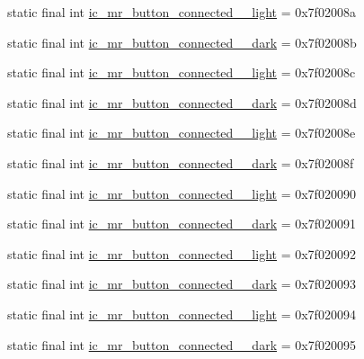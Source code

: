 \begin{CompactItemize}
\item 
static final int \hyperlink{classandroid_1_1support_1_1v7_1_1palette_1_1_r_1_1drawable_654a4f097dbb07716d0e2e15bcf35015}{ic\_\-mr\_\-button\_\-connected\_\_\-light} = 0x7f02008a
\item 
static final int \hyperlink{classandroid_1_1support_1_1v7_1_1palette_1_1_r_1_1drawable_660e1b0b5075051eba6f149d23b929e4}{ic\_\-mr\_\-button\_\-connected\_\_\-dark} = 0x7f02008b
\item 
static final int \hyperlink{classandroid_1_1support_1_1v7_1_1palette_1_1_r_1_1drawable_13553e0e8a4ba0c8f5db3b864c98f6d0}{ic\_\-mr\_\-button\_\-connected\_\_\-light} = 0x7f02008c
\item 
static final int \hyperlink{classandroid_1_1support_1_1v7_1_1palette_1_1_r_1_1drawable_2c73829dd1804f9e5162dd7b39815b56}{ic\_\-mr\_\-button\_\-connected\_\_\-dark} = 0x7f02008d
\item 
static final int \hyperlink{classandroid_1_1support_1_1v7_1_1palette_1_1_r_1_1drawable_2d203487b7f3edd479811921deea5f8e}{ic\_\-mr\_\-button\_\-connected\_\_\-light} = 0x7f02008e
\item 
static final int \hyperlink{classandroid_1_1support_1_1v7_1_1palette_1_1_r_1_1drawable_006099a5a9c6380cf6bb966d02b897a0}{ic\_\-mr\_\-button\_\-connected\_\_\-dark} = 0x7f02008f
\item 
static final int \hyperlink{classandroid_1_1support_1_1v7_1_1palette_1_1_r_1_1drawable_65f572d8d3689dd71ca137446f8d0982}{ic\_\-mr\_\-button\_\-connected\_\_\-light} = 0x7f020090
\item 
static final int \hyperlink{classandroid_1_1support_1_1v7_1_1palette_1_1_r_1_1drawable_e6784a5baf90ed8d2f946b2544700c47}{ic\_\-mr\_\-button\_\-connected\_\_\-dark} = 0x7f020091
\item 
static final int \hyperlink{classandroid_1_1support_1_1v7_1_1palette_1_1_r_1_1drawable_d81349bbc50c8910d729653e4545743b}{ic\_\-mr\_\-button\_\-connected\_\_\-light} = 0x7f020092
\item 
static final int \hyperlink{classandroid_1_1support_1_1v7_1_1palette_1_1_r_1_1drawable_68be17a073f9f7c34fe94fe2e07567d0}{ic\_\-mr\_\-button\_\-connected\_\_\-dark} = 0x7f020093
\item 
static final int \hyperlink{classandroid_1_1support_1_1v7_1_1palette_1_1_r_1_1drawable_fee44c7eb17a1b6755db4d4ed33d1999}{ic\_\-mr\_\-button\_\-connected\_\_\-light} = 0x7f020094
\item 
static final int \hyperlink{classandroid_1_1support_1_1v7_1_1palette_1_1_r_1_1drawable_41f586e3f70a838a917bf18e4ce9905b}{ic\_\-mr\_\-button\_\-connected\_\_\-dark} = 0x7f020095

\end{CompactItemize}
